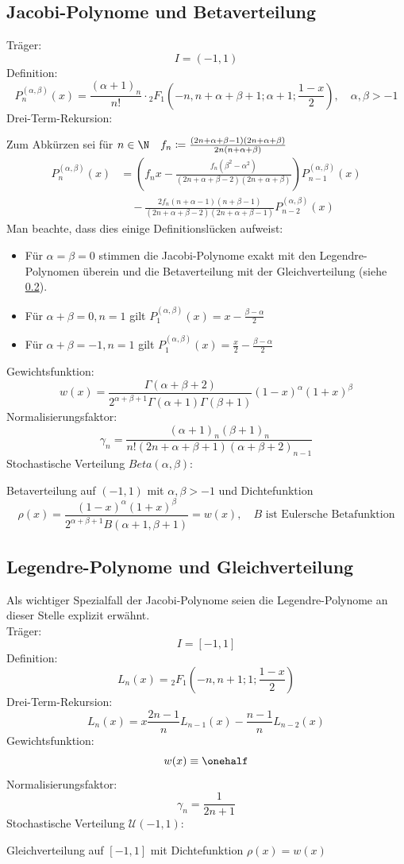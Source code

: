 \subsection{Jacobi-Polynome und Betaverteilung}
Träger:
\[I=(-1,1)\]
Definition:
\[P_n^{(\alpha, \beta)}(x)=\frac{(\alpha + 1)_n}{n!}\cdot {_2F_1}\left(-n,n+\alpha+\beta+1;\alpha+1;\frac{1-x}{2}\right),\quad \alpha,\beta>-1\]
Drei-Term-Rekursion:
\begin{center}
Zum Abkürzen sei für $n\in\N\quad f_n \coloneqq \frac{(2n + \alpha + \beta - 1)(2n + \alpha + \beta)}{2n(n + \alpha + \beta)}$
\begin{align*}
P_n^{(\alpha, \beta)}(x)&=\left(f_nx-\frac{f_n(\beta^2-\alpha^2)}{(2n + \alpha + \beta - 2)(2n + \alpha +\beta)}\right)P_{n-1}^{(\alpha, \beta)}(x)\\
&\quad-\frac{2f_n(n + \alpha - 1)(n + \beta - 1)}{(2n + \alpha + \beta - 2)(2n + \alpha + \beta - 1)}P_{n-2}^{(\alpha, \beta)}(x)
\end{align*}
Man beachte, dass dies einige Definitionslücken aufweist:
\begin{itemize}
\item Für $\alpha=\beta=0$ stimmen die Jacobi-Polynome exakt mit den Legendre-Polynomen überein und die Betaverteilung mit der Gleichverteilung (siehe \ref{seclegendre}).
\item Für $\alpha+\beta=0,n=1$ gilt $P_1^{(\alpha,\beta)}(x)=x-\frac{\beta-\alpha}{2}$
\item Für $\alpha+\beta=-1,n=1$ gilt $P_1^{(\alpha,\beta)}(x)=\frac{x}{2}-\frac{\beta-\alpha}{2}$
\end{itemize}
\end{center}
Gewichtsfunktion:
\[w(x)=\frac{\Gamma(\alpha+\beta+2)}{2^{\alpha+\beta+1}\Gamma(\alpha+1)\Gamma(\beta+1)}(1-x)^\alpha(1+x)^\beta\]
Normalisierungsfaktor:
\[\gamma_n=\frac{(\alpha+1)_n(\beta+1)_n}{n!(2n+\alpha+\beta+1)(\alpha+\beta+2)_{n-1}}\]
Stochastische Verteilung $Beta(\alpha,\beta)$:
\begin{center}
Betaverteilung auf $(-1,1)$ mit $\alpha,\beta>-1$ und Dichtefunktion
\[\rho(x)=\frac{(1 - x)^\alpha(1 + x)^\beta}{2^{\alpha + \beta + 1}B(\alpha+1,\beta+1)}=w(x),\quad B\text{ ist Eulersche Betafunktion}\]
\end{center}

\subsection{Legendre-Polynome und Gleichverteilung}
\label{seclegendre}
Als wichtiger Spezialfall der Jacobi-Polynome seien die Legendre-Polynome an dieser Stelle explizit erwähnt.\\
Träger:
\[I=[-1,1]\]
Definition:
\[L_n(x)={_2F_1}\left(-n,n+1;1;\frac{1-x}{2}\right)\]
Drei-Term-Rekursion:
\[L_{n}(x)=x\frac{2n-1}{n}L_{n-1}(x)-\frac{n-1}{n}L_{n-2}(x)\]
Gewichtsfunktion:
\[w(x)\equiv \onehalf\]
Normalisierungsfaktor:
\[\gamma_n=\frac{1}{2n+1}\]
Stochastische Verteilung $\mathcal{U}(-1,1)$:
\begin{center}
Gleichverteilung auf $[-1,1]$ mit Dichtefunktion $\rho(x)=w(x)$
\end{center}
